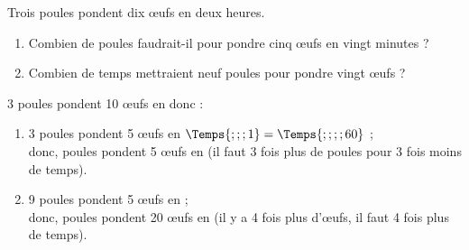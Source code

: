 \begin{exercice*} %
   Trois poules pondent dix \oe ufs en deux heures.
   \begin{enumerate}
      \item Combien de poules faudrait-il pour pondre cinq \oe ufs en vingt minutes ?
      \item Combien de temps mettraient neuf poules pour pondre vingt \oe ufs ?
   \end{enumerate}
\end{exercice*}

\begin{corrige}
   3 poules pondent 10 \oe ufs en  donc : \\
   \begin{enumerate}
      \item 3 poules pondent 5 \oe ufs en $\Temps{;;;1} =\Temps{;;;;60}$ ; \\
         donc, { poules pondent 5 \oe ufs en } (il faut 3 fois plus de poules pour 3 fois moins de temps). \\
      \item 9 poules pondent 5 \oe ufs en  ; \\
         donc, { poules pondent 20 \oe ufs en } (il y a 4 fois plus d'\oe ufs, il faut 4 fois plus de temps). \\ [5cm]
   \end{enumerate}
\end{corrige}